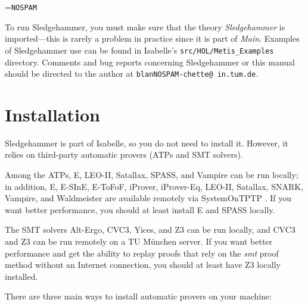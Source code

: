 \documentclass[a4paper,12pt]{article}
\begin{document}
\newbox\boxA
\setbox\boxA=\hbox{\texttt{NOSPAM}}

\newcommand\authoremail{\texttt{blan{\color{white}NOSPAM}\kern-\wd\boxA{}chette@\allowbreak
in.\allowbreak tum.\allowbreak de}}

To run Sledgehammer, you must make sure that the theory \textit{Sledgehammer} is
imported---this is rarely a problem in practice since it is part of
\textit{Main}. Examples of Sledgehammer use can be found in Isabelle's
\texttt{src/HOL/Metis\_Examples} directory.
Comments and bug reports concerning Sledgehammer or this manual should be
directed to the author at \authoremail.

\smallskipamount


\section{Installation}
\label{installation}

Sledgehammer is part of Isabelle, so you do not need to install it. However, it
relies on third-party automatic provers (ATPs and SMT solvers).

Among the ATPs, E, LEO-II, Satallax, SPASS, and Vampire can be run locally; in
addition, E, E-SInE, E-ToFoF, iProver, iProver-Eq, LEO-II, Satallax, SNARK,
Vampire, and Waldmeister are available remotely via System\-On\-TPTP
\cite{sutcliffe-2000}. If you want better performance, you should at least
install E and SPASS locally.

The SMT solvers Alt-Ergo, CVC3, Yices, and Z3 can be run locally, and CVC3 and
Z3 can be run remotely on a TU M\"unchen server. If you want better performance
and get the ability to replay proofs that rely on the \emph{smt} proof method
without an Internet connection, you should at least have Z3 locally installed.

There are three main ways to install automatic provers on your machine:
\end{document}
